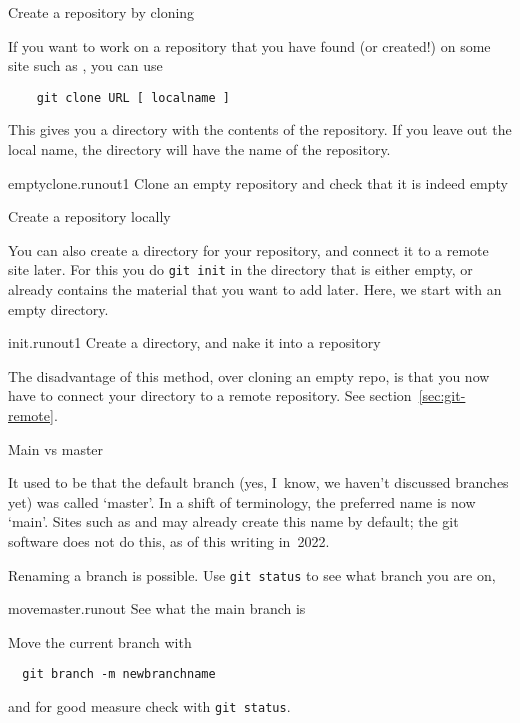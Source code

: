  {Create a repository by cloning}

If you want to work on a repository that you have found (or created!)
on some site such as , you can use
\begin{lstlisting}
    git clone URL [ localname ]
\end{lstlisting}
This gives you a directory with the contents of the repository.
If you leave out the local name, the directory will have the name
of the repository.

\begin{gitstep}{emptyclone.runout1}
  Clone an empty repository and check that it is indeed empty
\end{gitstep}

 {Create a repository locally}

You can also create a directory for your repository,
  and connect it to a remote site later.
  For this you do \lstinline{git init}
  in the directory that is either empty,
  or already contains the material that you want to add later.
  Here, we start with an empty directory.

\begin{gitstep}{init.runout1}
  Create a directory, and nake it into a repository
\end{gitstep}

The disadvantage of this method,
over cloning an empty repo,
is that you now have to connect your directory to a remote repository.
See section~\ref{sec:git-remote}.

 {Main vs master}

It used to be that the default branch
(yes, I~know, we haven't discussed branches yet)
was called `master'.
In a shift of terminology, the preferred name is now `main'.
Sites such as  and 
may already create this name by default;
the git software does not do this, as of this writing in~2022.

Renaming a branch is possible.
  Use \lstinline{git status} to see what branch you are on,

\begin{gitstep}{movemaster.runout}
  See what the main branch is
\end{gitstep}

Move the current branch with
\begin{lstlisting}
  git branch -m newbranchname
\end{lstlisting}
and for good measure check with \lstinline{git status}.

